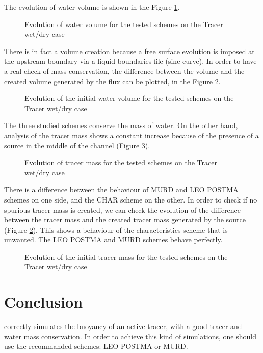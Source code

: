 The evolution of water volume is shown in the Figure \ref{fig:tracerwetdry:VoLTime}.

\begin{figure}[H]
\centering
  \caption{Evolution of water volume for the tested schemes on the Tracer wet/dry case}
\label{fig:tracerwetdry:VoLTime}
\end{figure}

There is in fact a volume creation because a free surface evolution is imposed at the upstream
boundary via a liquid boundaries file (sine curve). In order to have a real check of
mass conservation, the difference between the volume and the created volume
generated by the flux can be plotted, in the Figure \ref{fig:tracerwetdry:ConservedVoLTime}.

\begin{figure}[H]
\centering
  \caption{Evolution of the initial water volume for the tested schemes on the Tracer wet/dry case}
\label{fig:tracerwetdry:ConservedVoLTime}
\end{figure}

The three studied schemes conserve the mass of water.
On the other hand, analysis of the tracer mass shows a constant increase
because of the presence of a source in the middle of the channel (Figure \ref{fig:tracerwetdry:TracerMassTime}).

\begin{figure}[H]
\centering
  \caption{Evolution of tracer mass for the tested schemes on the Tracer wet/dry case}
\label{fig:tracerwetdry:TracerMassTime}
\end{figure}

There is a difference between the behaviour of MURD and LEO POSTMA schemes on one side,
and the CHAR scheme on the other. In order to check if no spurious tracer mass is created,
we can check the evolution of the difference between the tracer mass and the created tracer
mass generated by the source (Figure \ref{fig:tracerwetdry:ConservedVoLTime}).
This shows a behaviour of the characteristics scheme that is unwanted. The LEO POSTMA and MURD schemes behave perfectly.

\begin{figure}[H]
\centering
  \caption{Evolution of the initial tracer mass for the tested schemes on the Tracer wet/dry case}
\label{fig:tracerwetdry:ConservedTracerMassTime}
\end{figure}

\section{Conclusion}
%
 correctly simulates the buoyancy of an active tracer, with a good tracer and
water mass conservation. In order to achieve this kind of simulations, one should use
the recommanded schemes: LEO POSTMA or MURD.


